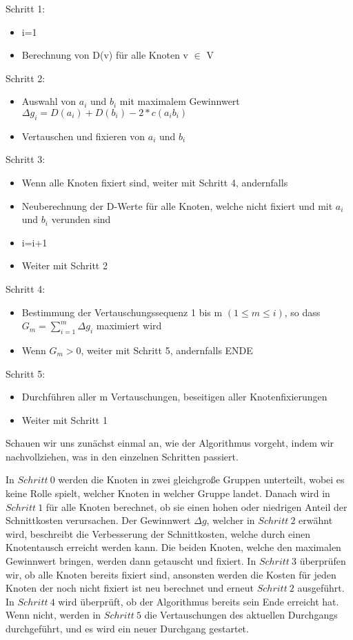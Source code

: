 Schritt 1:
\begin{itemize}
  \item i=1
  \item Berechnung von D(v) für alle Knoten v $\in$ V
\end{itemize}

Schritt 2:
\begin{itemize}
  \item Auswahl von $a_i$ und $b_i$ mit maximalem Gewinnwert $\Delta g_i =
  D(a_i) + D(b_i) - 2 * c(a_i b_i)$
  \item Vertauschen und fixieren von $a_i$ und $b_i$
\end{itemize}


Schritt 3:
\begin{itemize}
  \item Wenn alle Knoten fixiert sind, weiter mit Schritt 4, andernfalls
  \item Neuberechnung der D-Werte für alle Knoten, welche nicht fixiert und
  mit $a_i$ und $b_i$ verunden sind
  \item i=i+1
  \item Weiter mit Schritt 2
\end{itemize}

Schritt 4:
\begin{itemize}
  \item Bestimmung der Vertauschungssequenz 1 bis m $(1 \leq m \leq i)$, so dass
  $G_m = \sum_{i=1}^{m}{\Delta g_i}$ maximiert wird
  \item Wenn $G_m > 0$, weiter mit Schritt 5, andernfalls ENDE
\end{itemize}

Schritt 5:
\begin{itemize}
  \item Durchführen aller m Vertauschungen, beseitigen aller Knotenfixierungen
  \item Weiter mit Schritt 1
\end{itemize}\vspace{10pt}

Schauen wir uns zunächst einmal an, wie der Algorithmus vorgeht, indem wir
nachvollziehen, was in den einzelnen Schritten passiert.\vspace{10pt}

In $Schritt\ 0$ werden die Knoten in zwei gleichgroße Gruppen unterteilt, wobei
es keine Rolle spielt, welcher Knoten in welcher Gruppe landet. Danach wird in
$Schritt\ 1$ für alle Knoten berechnet, ob sie einen hohen oder niedrigen Anteil
der Schnittkosten verursachen. Der Gewinnwert $\Delta g$, welcher in $Schritt\
2$ erwähnt wird, beschreibt die Verbesserung der Schnittkosten, welche durch
einen Knotentausch erreicht werden kann. Die beiden Knoten, welche den
maximalen Gewinnwert bringen, werden dann getauscht und fixiert. In $Schritt\ 3$
überprüfen wir, ob alle Knoten bereits fixiert sind, ansonsten werden die Kosten
für jeden Knoten der noch nicht fixiert ist neu berechnet und erneut $Schritt\
2$ ausgeführt. In $Schritt\ 4$ wird überprüft, ob der Algorithmus bereits sein
Ende erreicht hat. Wenn nicht, werden in $Schritt\ 5$ die Vertauschungen des
aktuellen Durchgangs durchgeführt, und es wird ein neuer Durchgang gestartet.\vspace{10pt}

